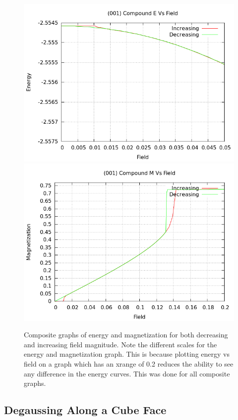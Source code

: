 \begin{figure}[ht]
\centering
\includegraphics[scale=0.5]{25june16/HVariedData/compoundEM/001Ecompound.png}
\includegraphics[scale=0.5]{25june16/HVariedData/compoundEM/001Mcompound.png}
\caption{Composite graphs of energy and magnetization for both decreasing and increasing field magnitude. Note the
different scales for the energy and magnetization graph. This is because plotting energy vs field on a graph
which has an xrange of 0.2 reduces the ability to see any difference in the energy curves. This was done for all 
composite graphs.}
\end{figure}
\clearpage
\subsection{Degaussing Along a Cube Face}

